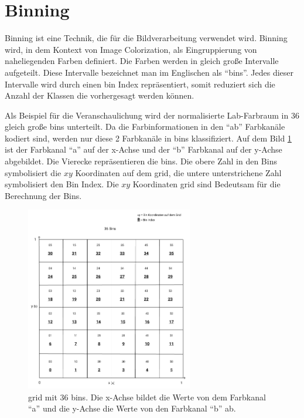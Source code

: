 \section{Binning}\label{section:binning}
Binning ist eine Technik, die für die Bildverarbeitung verwendet wird. Binning wird, in dem Kontext von Image Colorization, als Eingruppierung 
von naheliegenden Farben definiert. Die Farben werden in gleich große Intervalle aufgeteilt. Diese Intervalle bezeichnet man im Englischen als
``\gls{bin}s''. Jedes dieser Intervalle wird durch einen \gls{bin} Index repräsentiert, somit reduziert sich die Anzahl der Klassen die vorhergesagt werden
können.

Als Beispiel für die Veranschaulichung wird der normalisierte Lab-Farbraum in 36 gleich große \gls{bin}s unterteilt. Da die Farbinformationen 
in den ``ab'' Farbkanäle kodiert sind, werden nur diese 2 Farbkanäle in \gls{bin}s klassifiziert. Auf dem Bild \ref{image:bins} ist der Farbkanal 
``a'' auf der x-Achse und der ``b'' Farbkanal auf der y-Achse abgebildet. Die Vierecke repräsentieren die \gls{bin}s. Die obere Zahl in den Bins 
symbolisiert die $xy$ Koordinaten auf dem \gls{grid}, die untere unterstrichene Zahl symbolisiert den Bin Index. 
Die $xy$ Koordinaten \gls{grid} sind Bedeutsam für die Berechnung der Bins.

\begin{figure}[H]
  \centering
  \includegraphics[width=0.65\textwidth]{resources/bins/bins.jpg}
  \caption{
  \gls{grid} mit 36 bins. Die x-Achse bildet die Werte von dem Farbkanal ``a'' und die y-Achse die Werte von den Farbkanal ``b'' ab.
  }
  \label{image:bins}
\end{figure}

